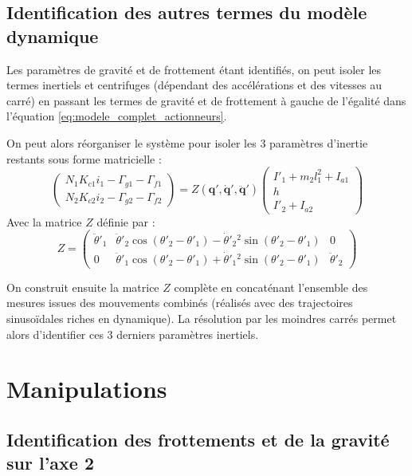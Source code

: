 \documentclass[10pt,a4paper,twocolumn]{article}
\begin{document}
\subsection{Identification des autres termes du modèle dynamique}
Les paramètres de gravité et de frottement étant identifiés, on peut isoler 
les termes inertiels et centrifuges (dépendant des accélérations et des vitesses au carré) 
en passant les termes de gravité et de frottement à gauche de l'égalité dans 
l'équation \eqref{eq:modele_complet_actionneurs}. 

On peut alors réorganiser le système pour isoler les 3 paramètres d'inertie 
restants sous forme matricielle :
\begin{equation}
  \begin{pmatrix}
    N_1 K_{c1} i_1 - \Gamma_{g1} - \Gamma_{f1} \\
    N_2 K_{c2} i_2 - \Gamma_{g2} - \Gamma_{f2}
  \end{pmatrix}
  =
  Z(\mathbf{q}', \dot{\mathbf{q}}', \ddot{\mathbf{q}}')
  \begin{pmatrix}
    I'_1 + m_2 l_1^2 + I_{a1} \\
    h \\
    I'_2 + I_{a2}
  \end{pmatrix}
\label{eq:modele_lineaire_inertie}
\end{equation}
Avec la matrice $Z$ définie par :
\begin{equation}
  Z = 
  \begin{pmatrix}
    \ddot{\theta}'_1 & \ddot{\theta}'_2\cos(\theta'_2-\theta'_1) - \dot{\theta}'_2{}^2\sin(\theta'_2-\theta'_1) & 0 \\
    0 & \ddot{\theta}'_1\cos(\theta'_2-\theta'_1) + \dot{\theta}'_1{}^2\sin(\theta'_2-\theta'_1) & \ddot{\theta}'_2
  \end{pmatrix}
\end{equation}

On construit ensuite la matrice $Z$ complète en concaténant l'ensemble des mesures 
issues des mouvements combinés (réalisés avec des trajectoires sinusoïdales riches en dynamique). 
La résolution par les moindres carrés permet alors d'identifier ces 3 derniers paramètres inertiels.

\section{Manipulations}
\subsection{Identification des frottements et de la gravité sur l'axe 2}
\end{document}
